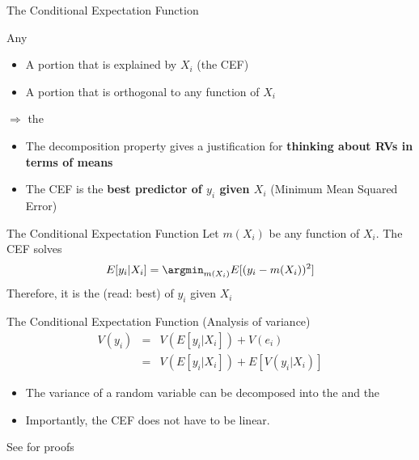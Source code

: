 \begin{frame}{The Conditional Expectation Function}

\vfill
Any  
\begin{itemize}
\item A portion that is explained by $X_i$ (the CEF)
\item A portion that is orthogonal to any function of $X_i$
\end{itemize}
\vfill
$\Rightarrow$ the 
\begin{itemize}
\item The decomposition property gives a justification for \textbf{thinking about RVs in terms of means}
\item The CEF is the \textbf{best predictor of $y_i$ given $X_i$} (Minimum Mean Squared Error)
\end{itemize}

\end{frame}


\begin{frame}{The Conditional Expectation Function}
Let $m(X_i)$ be any function of $X_i$. The CEF solves 
\begin{equation}
E[y_i|X_i]=\displaystyle{\argmin}_{m(X_i)} E[(y_i-m(X_i))^2]
\label{eq7}
\end{equation}
Therefore, it is the  (read: best) of $y_i$ given $X_i$
\end{frame}


\begin{frame}{The Conditional Expectation Function}
 (Analysis of variance)
\begin{eqnarray}
V(y_i)&=&V(E[y_i|X_i])+V(e_i) \\
&=& V(E[y_i|X_i])+E[V(y_i|X_i)]
\nonumber
\label{eq8}
\end{eqnarray}
\vfill
\begin{itemize}
\item The variance of a random variable can  be decomposed into the  and the 
\item Importantly, the CEF does not have to be linear. 
\end{itemize}
\vfill
See \citet[ch. 3.1.1]{angrist_2009} for proofs
\end{frame}


